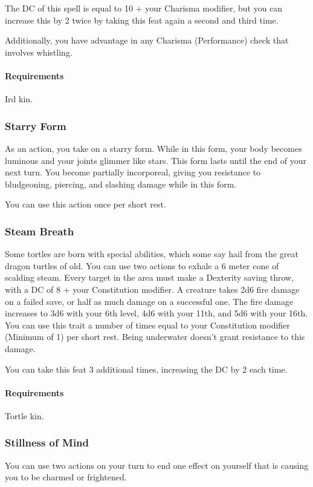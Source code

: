     The DC of this spell is equal to 10 + your Charisma modifier, but you can increase this by 2 twice by taking this feat again a second and third time.

    Additionally, you have advantage in any Charisma (Performance) check that involves whistling.
    \paragraph{Requirements} Ird kin.
\subsubsection{Starry Form} \label{feat::starryform}
    As an action, you take on a starry form.
    While in this form, your body becomes luminous and your joints glimmer like stars.
    This form lasts until the end of your next turn.
    You become partially incorporeal, giving you resistance to bludgeoning, piercing, and slashing damage while in this form.

    You can use this action once per short rest.
\subsubsection{Steam Breath} \label{feat::steambreath}
    Some tortles are born with special abilities, which some say hail from the great dragon turtles of old.
    You can use two actions to exhale a 6 meter cone of scalding steam.
    Every target in the area must make a Dexterity saving throw, with a DC of 8 + your Constitution modifier.
    A creature takes 2d6 fire damage on a failed save, or half as much damage on a successful one.
    The fire damage increases to 3d6 with your 6th level, 4d6 with your 11th, and 5d6 with your 16th.
    You can use this trait a number of times equal to your Constitution modifier (Minimum of 1) per short rest.
    Being underwater doesn't grant resistance to this damage.

    You can take this feat 3 additional times, increasing the DC by 2 each time.
    \paragraph{Requirements} Tortle kin.
\subsubsection{Stillness of Mind} \label{feat::stillnessofmind}
    You can use two actions on your turn to end one effect on yourself that is causing you to be charmed or frightened.

